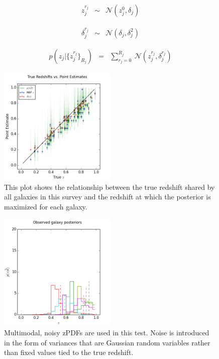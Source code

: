 \documentclass[preprint]{aastex}
\begin{document}
\begin{eqnarray}
\label{eq:zmany-each}
z^{r_{j}}_{j} &\sim& \mathcal{N}(z_{j}^{0},\delta_{j})
\end{eqnarray}

\begin{eqnarray}
\label{eq:zmany-how}
\delta^{r_{j}}_{j} &\sim& \mathcal{N}(\delta_{j},\delta^{2}_{j})
\end{eqnarray}

\begin{eqnarray}
\label{eq:zmany}
p(z_{j}|\{z^{r_{j}}_{j}\}_{R_{j}}) &=& \sum_{r_{j}=0}^{R_{j}}\ \mathcal{N}(z^{r_{j}}_{j},\delta^{r_{j}}_{j})
\end{eqnarray}

\begin{figure}
\includegraphics[width=0.5\textwidth]{multi/truevmap.png}
\caption{This plot shows the relationship between the true redshift shared by all galaxies in this survey and the redshift at which the posterior is maximized for each galaxy.}
\label{fig:multicat}
\end{figure}

\begin{figure}
\includegraphics[width=0.5\textwidth]{multi/samplepzs.png}
\caption{Multimodal, noisy zPDFs are used in this test.  Noise is introduced in the form of variances that are Gaussian random variables rather than fixed values tied to the true redshift.}
\label{fig:multipzs}
\end{figure}
\end{document}
